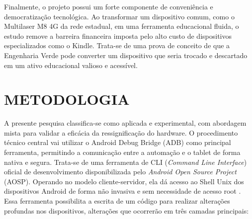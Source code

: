 \documentclass[
    12pt,
    openright,
    oneside,
    a4paper,
    english,
    brazilian
    ]{abntex2}
\begin{document}
Finalmente, o projeto possui um forte componente de conveniência e democratização tecnológica. Ao transformar um dispositivo comum, como o Multilaser M8 4G da rede estadual, em uma ferramenta educacional fluida, o estudo remove a barreira financeira imposta pelo alto custo de dispositivos especializados como o Kindle. Trata-se de uma prova de conceito de que a Engenharia Verde pode converter um dispositivo que seria trocado e descartado em um ativo educacional valioso e acessível.

\chapter{METODOLOGIA}
A presente pesquisa classifica-se como aplicada e experimental, com abordagem mista para validar a eficácia da ressignificação do hardware. O procedimento técnico central vai utilizar o Android Debug Bridge (ADB) como principal ferramenta, permitindo a comunicação entre a automação e o tablet de forma nativa e segura. Trata-se de uma ferramenta de CLI (\textit{Command Line Interface}) oficial de desenvolvimento disponibilizada pelo \textit{Android Open Source Project} (AOSP). Operando no modelo cliente-servidor, ela dá acesso ao Shell Unix dos dispositivos Android de forma não invasiva e sem necessidade de acesso root \cite{android2025}. Essa ferramenta possibilita a escrita de um código para realizar alterações profundas nos dispositivos, alterações que ocorrerão em três camadas principais:
\end{document}
